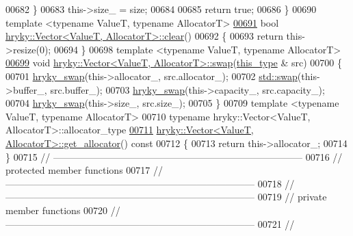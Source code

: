 \begin{DoxyCode}
00682     \}
00683     this->size\_ = size;
00684 
00685     \textcolor{keywordflow}{return} \textcolor{keyword}{true};
00686 \}
00690 \textcolor{keyword}{template} <\textcolor{keyword}{typename} ValueT, \textcolor{keyword}{typename} AllocatorT>
\hypertarget{vector_8h_source_l00691}{}\hyperlink{classhryky_1_1_vector_a674ecb00d223d91ba58bb45540be9983}{00691} \textcolor{keywordtype}{bool} \hyperlink{namespacehryky_aa201297ea9530da954a7230be71cc19d}{hryky::Vector<ValueT, AllocatorT>::clear}()
00692 \{
00693     \textcolor{keywordflow}{return} this->resize(0);
00694 \}
00698 \textcolor{keyword}{template} <\textcolor{keyword}{typename} ValueT, \textcolor{keyword}{typename} AllocatorT>
\hypertarget{vector_8h_source_l00699}{}\hyperlink{classhryky_1_1_vector_abcf365626457abf95d05b0a736e7a60a}{00699} \textcolor{keywordtype}{void} \hyperlink{namespacehryky_a4282146df5ea2b68cb667896a2205909}{hryky::Vector<ValueT, AllocatorT>::swap}(\hyperlink{classhryky_1_1_vector}{this_type} & src)
00700 \{
00701     \hyperlink{namespacehryky_add9c1c1fdfda07cd47bcb7c16d3a823a}{hryky_swap}(this->allocator\_,   src.allocator\_);
00702     \hyperlink{namespacehryky_a4282146df5ea2b68cb667896a2205909}{std::swap}(this->buffer\_,        src.buffer\_);
00703     \hyperlink{namespacehryky_add9c1c1fdfda07cd47bcb7c16d3a823a}{hryky_swap}(this->capacity\_,    src.capacity\_);
00704     \hyperlink{namespacehryky_add9c1c1fdfda07cd47bcb7c16d3a823a}{hryky_swap}(this->size\_,        src.size\_);
00705 \}
00709 \textcolor{keyword}{template} <\textcolor{keyword}{typename} ValueT, \textcolor{keyword}{typename} AllocatorT>
00710 \textcolor{keyword}{typename} hryky::Vector<ValueT, AllocatorT>::allocator\_type 
\hypertarget{vector_8h_source_l00711}{}\hyperlink{classhryky_1_1_vector_a435d9e9b71aaf09e9281e671742ba2e0}{00711} \hyperlink{classhryky_1_1_vector}{hryky::Vector<ValueT, AllocatorT>::get_allocator}()\textcolor{keyword}{ const}
00712 \textcolor{keyword}{}\{
00713     \textcolor{keywordflow}{return} this->allocator\_;
00714 \}
00715 \textcolor{comment}{//
      ------------------------------------------------------------------------------}
00716 \textcolor{comment}{// protected member functions}
00717 \textcolor{comment}{//
      ------------------------------------------------------------------------------}
00718 \textcolor{comment}{//
      ------------------------------------------------------------------------------}
00719 \textcolor{comment}{// private member functions}
00720 \textcolor{comment}{//
      ------------------------------------------------------------------------------}
00721 \textcolor{comment}{//
}
\end{DoxyCode}
